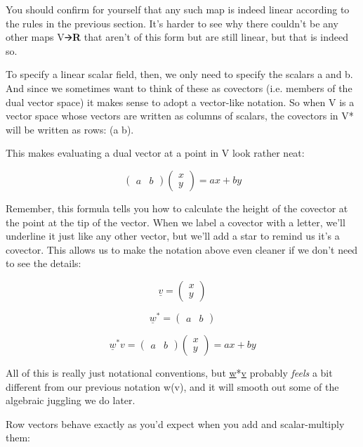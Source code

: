 \documentclass[oneside,english]{amsbook}
\numberwithin{section}{chapter}
\theoremstyle{plain}
\theoremstyle{definition}
\begin{document}
You should confirm for yourself that any such map is indeed linear
according to the rules in the previous section. It's harder to see why
there couldn't be any other maps V🡪\textbf{R} that aren't of this form
but are still linear, but that is indeed so.

To specify a linear scalar field, then, we only need to specify the
scalars a and b. And since we sometimes want to think of these as
covectors (i.e. members of the dual vector space) it makes sense to
adopt a vector-like notation. So when V is a vector space whose vectors
are written as columns of scalars, the covectors in V* will be written
as rows: (a b).

This makes evaluating a dual vector at a point in V look rather neat:

\[\begin{pmatrix}
	a & b
\end{pmatrix}\begin{pmatrix}
	x \\
	y
\end{pmatrix} = ax + by\]

Remember, this formula tells you how to calculate the height of the
covector at the point at the tip of the vector. When we label a covector
with a letter, we'll underline it just like any other vector, but we'll
add a star to remind us it's a covector. This allows us to make the
notation above even cleaner if we don't need to see the details:

\[\underline{v} = \begin{pmatrix}
	x \\
	y
\end{pmatrix}\]

\[{\underline{w}}^{*} = \begin{pmatrix}
	a & b
\end{pmatrix}\]

\[{\underline{w}}^{*}v = \begin{pmatrix}
	a & b
\end{pmatrix}\begin{pmatrix}
	x \\
	y
\end{pmatrix} = ax + by\]

All of this is really just notational conventions, but \ul{w}*\ul{v}
probably \emph{feels} a bit different from our previous notation w(v),
and it will smooth out some of the algebraic juggling we do later.

Row vectors behave exactly as you'd expect when you add and
scalar-multiply them:
\end{document}
